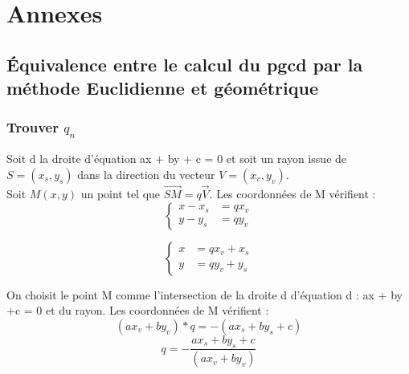 \section{Annexes}

\subsection{Équivalence entre le calcul du pgcd par la méthode Euclidienne et géométrique}
\label{annexe-euc-geo}

\subsubsection{Trouver $q_n$}

Soit d la droite d'équation ax + by + c = 0 et soit un rayon issue de $S=(x_s, y_s)$ dans la direction du vecteur $V=(x_v, y_v)$.\\
Soit $M(x,y)$ un point tel que $\overrightarrow{SM} = q \overrightarrow{V}$. Les coordonnées de M vérifient : \\
 
\begin{equation*}
    \left\{
    \begin{split}
      x - x_s &= q x_v \\
      y - y_s &= q y_v 
   \end{split}
   \right. 
\end{equation*}

\begin{equation*}
    \left\{
    \begin{split}
      x &= q x_v + x_s \\
      y &= q y_v + y_s 
   \end{split}
   \right. 
\end{equation*}


On choisit le point M comme l'intersection de la droite d d'équation d : ax + by +c = 0 et du rayon. Les coordonnées de M vérifient : \\

$$(a x_v + b y_v) * q = -(a x_s + b y_s +c)$$
$$q = - \frac{a x_s + b y_s +c}{(a x_v + b y_v)}$$

